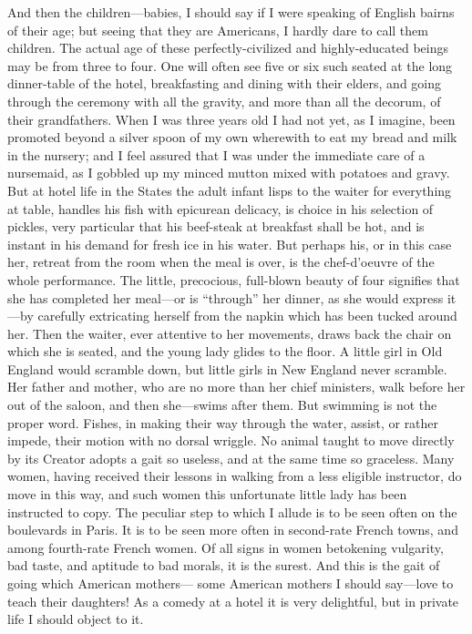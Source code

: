 And then the children---babies, I should say if I were speaking of
English bairns of their age; but seeing that they are Americans, I
hardly dare to call them children.  The actual age of these
perfectly-civilized and highly-educated beings may be from three to
four.  One will often see five or six such seated at the long
dinner-table of the hotel, breakfasting and dining with their
elders, and going through the ceremony with all the gravity, and
more than all the decorum, of their grandfathers.  When I was three
years old I had not yet, as I imagine, been promoted beyond a
silver spoon of my own wherewith to eat my bread and milk in the
nursery; and I feel assured that I was under the immediate care of
a nursemaid, as I gobbled up my minced mutton mixed with potatoes
and gravy.  But at hotel life in the States the adult infant lisps
to the waiter for everything at table, handles his fish with
epicurean delicacy, is choice in his selection of pickles, very
particular that his beef-steak at breakfast shall be hot, and is
instant in his demand for fresh ice in his water.  But perhaps his,
or in this case her, retreat from the room when the meal is over,
is the chef-d'oeuvre of the whole performance.  The little,
precocious, full-blown beauty of four signifies that she has
completed her meal---or is ``through'' her dinner, as she would
express it---by carefully extricating herself from the napkin which
has been tucked around her.  Then the waiter, ever attentive to her
movements, draws back the chair on which she is seated, and the
young lady glides to the floor.  A little girl in Old England would
scramble down, but little girls in New England never scramble.  Her
father and mother, who are no more than her chief ministers, walk
before her out of the saloon, and then she---swims after them.  But
swimming is not the proper word.  Fishes, in making their way
through the water, assist, or rather impede, their motion with no
dorsal wriggle.  No animal taught to move directly by its Creator
adopts a gait so useless, and at the same time so graceless.  Many
women, having received their lessons in walking from a less
eligible instructor, do move in this way, and such women this
unfortunate little lady has been instructed to copy.  The peculiar
step to which I allude is to be seen often on the boulevards in
Paris.  It is to be seen more often in second-rate French towns,
and among fourth-rate French women.  Of all signs in women
betokening vulgarity, bad taste, and aptitude to bad morals, it is
the surest.  And this is the gait of going which American mothers---%
some American mothers I should say---love to teach their daughters!
As a comedy at a hotel it is very delightful, but in private life I
should object to it.

